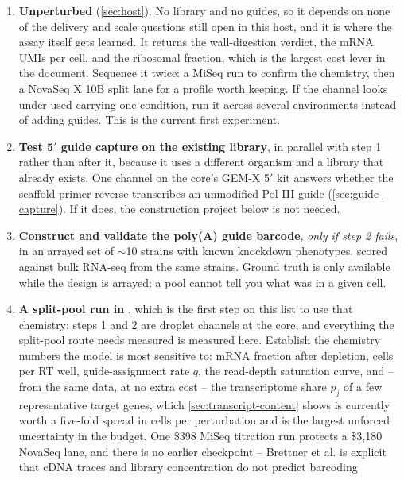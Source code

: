 \begin{enumerate}[leftmargin=1.4em,itemsep=2pt,topsep=2pt]
  \item \textbf{Unperturbed } (\cref{sec:host}). No
    library and no guides, so it depends on none of the delivery and scale
    questions still open in this host, and it is where the assay itself gets
    learned. It returns the wall-digestion verdict, the mRNA UMIs per cell, and
    the ribosomal fraction, which is the largest cost lever in the document.
    Sequence it twice: a MiSeq run to confirm the chemistry, then a NovaSeq X 10B
    split lane for a profile worth keeping. If the channel looks under-used
    carrying one condition, run it across several environments instead of adding
    guides. This is the current first experiment.
  \item \textbf{Test 5$'$ guide capture on the existing
     library}, in parallel with step 1 rather than after it,
    because it uses a different organism and a library that already exists. One
    channel on the core's GEM-X 5$'$ kit answers whether the scaffold primer
    reverse transcribes an unmodified Pol III guide (\cref{sec:guide-capture}).
    If it does, the construction project below is not needed.
  \item \textbf{Construct and validate the poly(A) guide barcode}, \emph{only if
    step 2 fails}, in an arrayed set of $\sim$10 strains with known knockdown
    phenotypes, scored against bulk RNA-seq from the same strains. Ground truth
    is only available while the design is arrayed; a pool cannot tell you what
    was in a given cell.
  \item \textbf{A split-pool run in }, which is the first
    step on this list to use that chemistry: steps 1 and 2 are droplet channels
    at the core, and everything the split-pool route needs measured is measured
    here. Establish the chemistry numbers the model is most sensitive to:
    mRNA fraction after depletion, cells per RT well, guide-assignment rate $q$,
    the read-depth saturation curve, and -- from the same data, at no extra cost -- the transcriptome share $p_j$ of a few representative target genes, which
    \cref{sec:transcript-content} shows is currently worth a five-fold spread in
    cells per perturbation and is the largest unforced uncertainty in the budget. One \$398 MiSeq titration run protects a
    \$3{,}180 NovaSeq lane, and there is no earlier checkpoint -- Brettner et al. is
    explicit that cDNA traces and library concentration do not predict barcoding

\end{enumerate}
